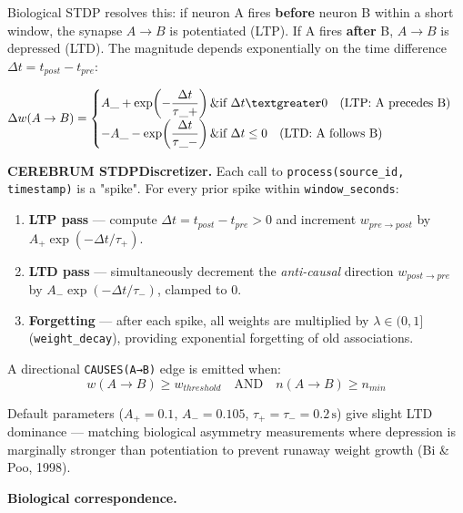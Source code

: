 \documentclass[10pt,journal,compsoc]{IEEEtran}
\begin{document}
Biological STDP resolves this: if neuron A fires \textbf{before} neuron B within a short window, the synapse $A \to B$ is potentiated (LTP). If A fires \textbf{after} B, $A \to B$ is depressed (LTD). The magnitude depends expon\-entially on the time difference $\Delta t = t_{post} - t_{pre}$:

$$\Delta w(A \to B) = \begin{cases}
A\_+ \exp\!\left(-\dfrac{\Delta t}{\tau\_+}\right) \& \text{if } \Delta t \textgreater  0 \quad (\text{LTP: A precedes B}) \\[6pt]
-A\_- \exp\!\left(\dfrac{\Delta t}{\tau\_-}\right) \& \text{if } \Delta t \leq 0 \quad (\text{LTD: A follows B})
\end{cases}$$

\textbf{CEREBRUM STDPDiscre\-tizer.} Each call to \texttt{process(source\_id, timestamp)} is a "spike". For every prior spike within \texttt{window\_seconds}:

\begin{enumerate}
\item \textbf{LTP pass} — compute $\Delta t = t_{post} - t_{pre} > 0$ and increment $w_{pre \to post}$ by $A_+ \exp(-\Delta t / \tau_+)$.
\item \textbf{LTD pass} — simul\-taneously decrement the \textit{anti-causal} direction $w_{post \to pre}$ by $A_- \exp(-\Delta t / \tau_-)$, clamped to 0.
\item \textbf{Forgetting} — after each spike, all weights are multiplied by $\lambda \in (0,1]$ (\texttt{weight\_decay}), providing exponential forgetting of old assoc\-iations.

\end{enumerate}
A directional \texttt{CAUSES(A→B)} edge is emitted when:
\begin{equation}
w(A \to B) \geq w_{threshold} \quad \text{AND} \quad n(A \to B) \geq n_{min}
\end{equation}

Default parameters ($A_+ = 0.1$, $A_- = 0.105$, $\tau_+ = \tau_- = 0.2\,\text{s}$) give slight LTD dominance — matching biological asymmetry measu\-rements where depression is marginally stronger than poten\-tiation to prevent runaway weight growth (Bi \& Poo, 1998).

\textbf{Biological corre\-spondence.}
\end{document}
